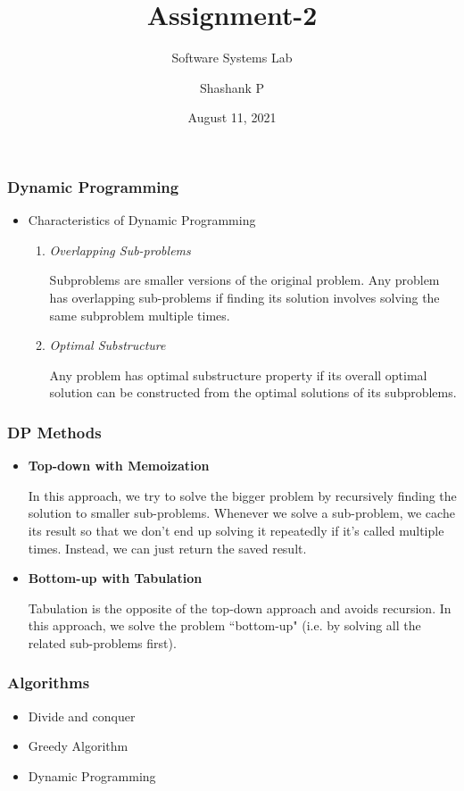 \documentclass{beamer}
\title{Assignment-2}
\subtitle{Software Systems Lab}
\author{Shashank P}
\institute{IIT Dharwad \\ \url{https://www.iitdh.ac.in/}}
\date{August 11, 2021}
\begin{document}
	\frame{\titlepage}
	\begin{frame}
		\frametitle{Dynamic Programming}
		\begin{itemize}
			\item Characteristics of Dynamic Programming
			\begin{enumerate}
				\item \textit{Overlapping Sub-problems}
				\begin{block}{1}
					Subproblems are smaller versions of the original problem. Any
					problem has overlapping sub-problems if finding its solution involves
					solving the same subproblem multiple times.
				\end{block}
				\item \textit{Optimal Substructure}
				\begin{block}{2}
					Any problem has optimal substructure property if its overall optimal
					solution can be constructed from the optimal solutions of its
					subproblems.
				\end{block}
			\end{enumerate}
		\end{itemize}
	\end{frame}
	\begin{frame}
		\frametitle{DP Methods}
		\begin{itemize}
			\item<1-> \textbf{Top-down with Memoization}
			\begin{block}{1}
				In this approach, we try to solve the bigger problem by
				recursively finding the solution to smaller sub-problems.
				Whenever we solve a sub-problem, we cache its result so that
				we don't end up solving it repeatedly if it's called multiple
				times. Instead, we can just return the saved result.
			\end{block}
			\item<2-> \textbf{Bottom-up with Tabulation}
			\begin{alertblock}{2}
				Tabulation is the opposite of the top-down approach and avoids
				recursion. In this approach, we solve the problem ``bottom-up"
				(i.e. by solving all the related sub-problems first).
			\end{alertblock}
		\end{itemize}
	\end{frame}
	\begin{frame}
		\transsplitverticalin
		\label{dac}
		\frametitle{Algorithms}
		\begin{itemize}
			\setbeamercovered{transparent}
			\item<1-> Divide and conquer
			\item<2-> Greedy Algorithm
			\item<3-> Dynamic Programming
		\end{itemize}
	\end{frame}
\end{document}
